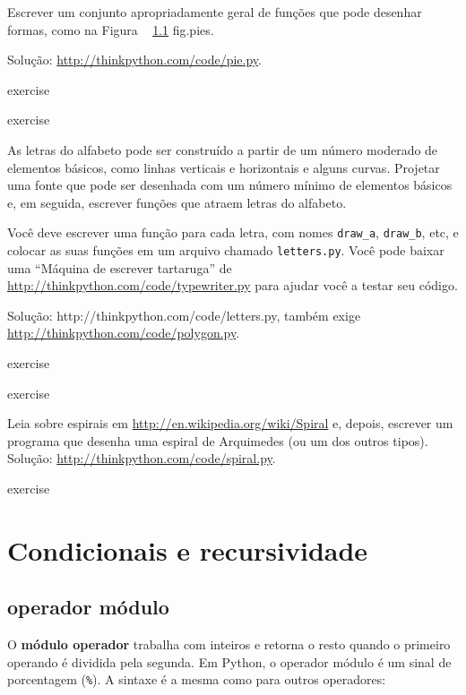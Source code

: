 \documentclass[10pt]{book}
\begin{document}
\begin{exercise}
\begin{}
Escrever um conjunto apropriadamente geral de funções que
pode desenhar formas, como na Figura ~ \ref {} fig.pies.

Solução: \url{http://thinkpython.com/code/pie.py}.

\end{} exercise

\begin{} exercise

As letras do alfabeto pode ser construído a partir de um número moderado
de elementos básicos, como linhas verticais e horizontais e alguns
curvas. Projetar uma fonte que pode ser desenhada com um número mínimo de
elementos básicos e, em seguida, escrever funções que atraem letras do
alfabeto.

Você deve escrever uma função para cada letra, com nomes
\Verb "draw_a", \verb "draw_b", etc, e colocar as suas funções
em um arquivo chamado {\tt letters.py}. Você pode baixar uma
``Máquina de escrever tartaruga'' de \url{http://thinkpython.com/code/typewriter.py}
para ajudar você a testar seu código.

Solução: \url{} http://thinkpython.com/code/letters.py, também exige
\url{http://thinkpython.com/code/polygon.py}.

\end{} exercise

\begin{} exercise

Leia sobre espirais em \url{http://en.wikipedia.org/wiki/Spiral} e, depois,
escrever um programa que desenha uma espiral de Arquimedes (ou um dos outros
tipos). Solução: \url{http://thinkpython.com/code/spiral.py}.

\end{} exercise


\chapter{Condicionais e recursividade}

\section{operador módulo}

O {\bf módulo operador} trabalha com inteiros e retorna o resto
quando o primeiro operando é dividida pela segunda. Em Python, o
operador módulo é um sinal de porcentagem (\verb "%
como para outros operadores:


\end{exercise}
\end{document}
